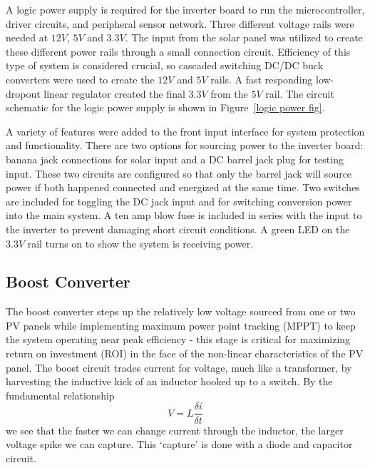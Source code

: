 A logic power supply is required for the inverter board to run the microcontroller, driver circuits, and peripheral sensor network. Three different voltage rails were needed at $12V$, $5V$ and $3.3V$. The input from the solar panel was utilized to create these different power rails through a small connection circuit. Efficiency of this type of system is considered crucial, so cascaded switching DC/DC buck converters were used to create the $12V$ and $5V$ rails. A fast responding low-dropout linear regulator created the final $3.3V$ from the $5V$ rail. The circuit schematic for the logic power supply is shown in Figure~\ref{logic power fig}.

A variety of features were added to the front input interface for system protection and functionality. There are two options for sourcing power to the inverter board: banana jack connections for solar input and a DC barrel jack plug for testing input. These two circuits are configured so that only the barrel jack will source power if both happened connected and energized at the same time. Two switches are included for toggling the DC jack input and for switching conversion power into the main system. A ten amp blow fuse is included in series with the input to the inverter to prevent damaging short circuit conditions. A green LED on the $3.3V$ rail turns on to show the system is receiving power.
\subsection{Boost Converter}
The boost converter steps up the relatively low voltage sourced from one or two PV panels while implementing maximum power point tracking (MPPT) to keep the system operating near peak efficiency - this stage is critical for maximizing return on investment (ROI) in the face of the non-linear characteristics of the PV panel. The boost circuit trades current for voltage, much like a transformer, by harvesting the inductive kick of an inductor hooked up to a switch. By the fundamental relationship
\begin{equation}
V=L\frac{\delta i}{\delta t}
\end{equation}
 we see that the faster we can change current through the inductor, the larger voltage spike we can capture. This `capture' is done with a diode and capacitor circuit.

